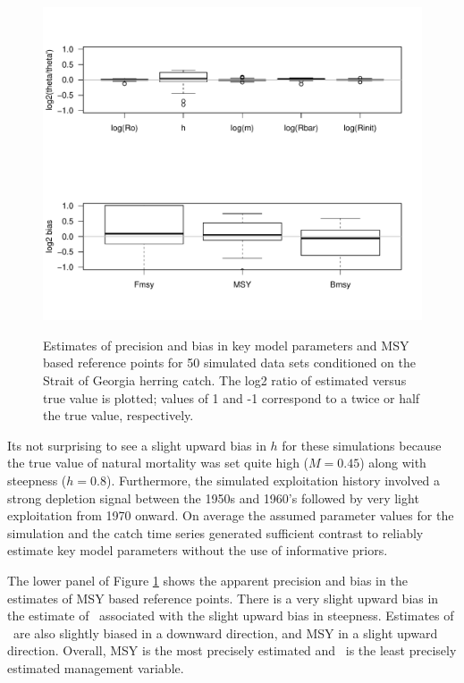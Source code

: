 \begin{figure}[!tbp]
	\includegraphics[width=\textwidth]{Figs/SOGParameterBias.pdf}\\
	\caption{Estimates of precision and bias in key model parameters and MSY based reference points for 50 simulated data sets conditioned on the Strait of Georgia herring catch. The log2 ratio of estimated versus true value is plotted; values of 1 and -1 correspond to a twice or  half the true value, respectively.}\label{FigSogBias}
\end{figure}

Its not surprising to see a slight upward bias in $h$ for these simulations because the true value of natural mortality was set quite high ($M=0.45$) along with steepness ($h=0.8$).  Furthermore, the simulated exploitation history involved a strong depletion signal between the 1950s and 1960's followed by very light exploitation from 1970 onward.  On average the assumed parameter values for the simulation and the catch time series generated sufficient contrast to reliably estimate key model parameters without the use of informative priors.

The lower panel of Figure \ref{FigSogBias} shows the apparent precision and bias in the estimates of MSY based reference points.  There is a very slight upward bias in the estimate of \fmsy\ associated with the slight upward bias in steepness.  Estimates of \bmsy\ are also slightly biased in a downward direction, and MSY in a slight upward direction.  Overall, MSY is the most precisely estimated and \fmsy\ is the least precisely estimated management variable.


